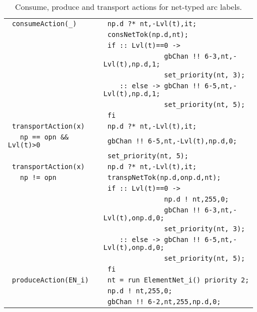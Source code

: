 \documentclass{llncs}
\begin{document}
\small
\begin{table}[h!]
\begin{center}\begin{tabular}{|l|l|}
      \hline
      \verb" consumeAction(_)" & \verb" np.d ?* nt,-Lvl(t),it; "    \\
                               & \verb" consNetTok(np.d,nt);"          \\
                               & \verb" if :: Lvl(t)==0 -> " \\
                               & \verb"               gbChan !! 6-3,nt,-Lvl(t),np.d,1; " \\
                               & \verb"               set_priority(nt, 3);" \\
                               & \verb"    :: else -> gbChan !! 6-5,nt,-Lvl(t),np.d,1; "  \\
                               & \verb"               set_priority(nt, 5);" \\
                               & \verb" fi" \\
      \hline
      \verb" transportAction(x) "        & \verb" np.d ?* nt,-Lvl(t),it;"\\
      \verb"   np == opn && Lvl(t)>0  "  & \verb" gbChan !! 6-5,nt,-Lvl(t),np.d,0;"   \\
                                         & \verb" set_priority(nt, 5);" \\
      \hline
      \verb" transportAction(x)" & \verb" np.d ?* nt,-Lvl(t),it;"\\
      \verb"   np != opn "         & \verb" transpNetTok(np.d,onp.d,nt);" \\
                                 & \verb" if :: Lvl(t)==0 -> " \\
                                 & \verb"               np.d ! nt,255,0;  " \\
                                 & \verb"               gbChan !! 6-3,nt,-Lvl(t),onp.d,0; "   \\
                                 & \verb"               set_priority(nt, 3);" \\
                                 & \verb"    :: else -> gbChan !! 6-5,nt,-Lvl(t),onp.d,0; "   \\
                                 & \verb"               set_priority(nt, 5);" \\
                                 & \verb" fi"                   \\
      \hline
      \verb" produceAction(EN_i)" & \verb" nt = run ElementNet_i() priority 2;"\\
                                  & \verb" np.d ! nt,255,0; "\\
                                  & \verb" gbChan !! 6-2,nt,255,np.d,0; "\\
      \hline
\end{tabular}\end{center}
\vspace{-2pt}
\caption{Consume, produce and transport actions for net-typed arc labels.}
\label{tab.act.net.places.imp.p}
\end{table}
\normalsize
\end{document}
